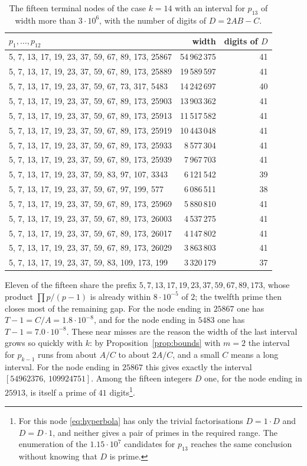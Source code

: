 \documentclass[screen,reqno]{aomart}
\numberwithin{equation}{section}
\theoremstyle{plain}
\theoremstyle{definition}
\theoremstyle{remark}
\begin{document}
\begin{table}[ht]
\centering
\caption{The fifteen terminal nodes of the case $k=14$ with an interval
for $p_{13}$ of width more than $3\cdot10^6$, with the number of digits
of $D=2AB-C$.}
\label{tab:hard}
\smallskip
\small
\begin{tabular}{@{}lrr@{}}
\toprule
$p_1,\dots,p_{12}$ & width & digits of $D$ \\
\midrule
5, 7, 13, 17, 19, 23, 37, 59, 67, 89, 173, 25867  & 54\,962\,375 & 41 \\
5, 7, 13, 17, 19, 23, 37, 59, 67, 89, 173, 25889  & 19\,589\,597 & 41 \\
5, 7, 13, 17, 19, 23, 37, 59, 67, 73, 317, 5483   & 14\,242\,697 & 40 \\
5, 7, 13, 17, 19, 23, 37, 59, 67, 89, 173, 25903  & 13\,903\,362 & 41 \\
5, 7, 13, 17, 19, 23, 37, 59, 67, 89, 173, 25913  & 11\,517\,582 & 41 \\
5, 7, 13, 17, 19, 23, 37, 59, 67, 89, 173, 25919  & 10\,443\,048 & 41 \\
5, 7, 13, 17, 19, 23, 37, 59, 67, 89, 173, 25933  &  8\,577\,304 & 41 \\
5, 7, 13, 17, 19, 23, 37, 59, 67, 89, 173, 25939  &  7\,967\,703 & 41 \\
5, 7, 13, 17, 19, 23, 37, 59, 83, 97, 107, 3343   &  6\,121\,542 & 39 \\
5, 7, 13, 17, 19, 23, 37, 59, 67, 97, 199, 577    &  6\,086\,511 & 38 \\
5, 7, 13, 17, 19, 23, 37, 59, 67, 89, 173, 25969  &  5\,880\,810 & 41 \\
5, 7, 13, 17, 19, 23, 37, 59, 67, 89, 173, 26003  &  4\,537\,275 & 41 \\
5, 7, 13, 17, 19, 23, 37, 59, 67, 89, 173, 26017  &  4\,147\,802 & 41 \\
5, 7, 13, 17, 19, 23, 37, 59, 67, 89, 173, 26029  &  3\,863\,803 & 41 \\
5, 7, 13, 17, 19, 23, 37, 59, 83, 109, 173, 199   &  3\,320\,179 & 37 \\
\bottomrule
\end{tabular}
\end{table}

Eleven of the fifteen share the prefix
$5,7,13,17,19,23,37,59,67,89,173$, whose product
$\prod p/(p-1)$ is already within $8\cdot10^{-5}$ of $2$; the twelfth
prime then closes most of the remaining gap. For the node ending in
$25867$ one has $T-1=C/A=1.8\cdot10^{-8}$, and for the node ending in
$5483$ one has $T-1=7.0\cdot10^{-8}$. These near misses are the
reason the width of the last interval grows so quickly with $k$: by
Proposition~\ref{prop:bounds} with $m=2$ the interval for $p_{k-1}$
runs from about $A/C$ to about $2A/C$, and a small $C$ means a long
interval. For the node ending in $25867$ this gives exactly the
interval $[54962376,\,109924751]$. Among
the fifteen integers $D$ one, for the node ending in $25913$, is itself
a prime of $41$ digits\footnote{For this node \eqref{eq:hyperbola} has
only the trivial factorisations $D=1\cdot D$ and $D=D\cdot1$, and
neither gives a pair of primes in the required range. The enumeration
of the $1.15\cdot10^7$ candidates for $p_{13}$ reaches the same
conclusion without knowing that $D$ is prime.}.
\end{document}
